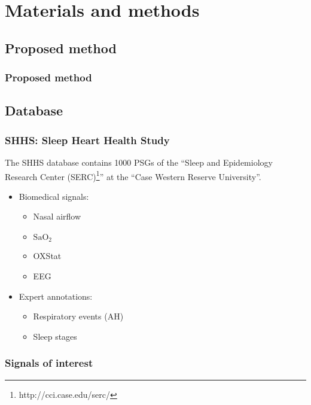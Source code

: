 \documentclass{beamer}
\begin{document}
\section{Materials and methods}
\subsection{Proposed method}
\begin{frame}
\frametitle {Proposed method}
\begin{center}
\end{center}
\end{frame}
\subsection{Database}
\begin{frame}
\frametitle {SHHS: Sleep Heart Health Study}
The SHHS database contains 1000 PSGs of the ``Sleep and Epidemiology Research Center (SERC)\footnote{http://cci.case.edu/serc/}'' at the ``Case Western Reserve University''.\\
	\pause
\begin{itemize}
	\item Biomedical signals:
	\begin{itemize}
	 	\item Nasal airflow
	 	\item \alert{$\text{SaO}_2$}
   	 	\item OXStat
   	 	\item EEG
	\end{itemize}
	\pause
   \item Expert annotations:
	\begin{itemize} 
	 \item \alert{Respiratory events (AH)}
 	 \item Sleep stages
	\end{itemize}
  \end{itemize}
\end{frame}
\begin{frame}
\frametitle {Signals of interest}
\begin{center}
\end{center}
\end{frame}
\end{document}
